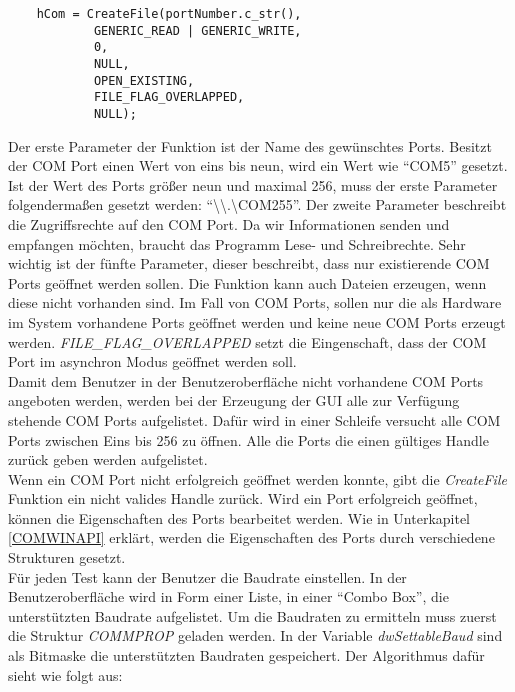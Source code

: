 \begin{lstlisting}	 
	hCom = CreateFile(portNumber.c_str(),  
            GENERIC_READ | GENERIC_WRITE,
            0, 
            NULL,
            OPEN_EXISTING, 
            FILE_FLAG_OVERLAPPED,
            NULL); 

\end{lstlisting}

Der erste Parameter der Funktion ist der Name des gewünschtes Ports. Besitzt der COM Port einen Wert von eins bis neun, wird ein Wert wie "`COM5"' gesetzt. Ist der Wert des Ports größer neun und maximal 256, muss der erste Parameter folgendermaßen gesetzt werden: "`\textbackslash\textbackslash.\textbackslash COM255"'. Der zweite Parameter beschreibt die Zugriffsrechte auf den COM Port. Da wir Informationen senden und empfangen möchten, braucht das Programm Lese- und Schreibrechte. Sehr wichtig ist der fünfte Parameter, dieser beschreibt, dass nur existierende COM Ports geöffnet werden sollen. Die Funktion kann auch Dateien erzeugen, wenn diese nicht vorhanden sind. Im Fall von COM Ports, sollen nur die als Hardware im System vorhandene Ports geöffnet werden und keine neue COM Ports erzeugt werden. \textit{FILE\_FLAG\_OVERLAPPED} setzt die Eingenschaft, dass der COM Port im asynchron Modus geöffnet werden soll.\\

Damit dem Benutzer in der Benutzeroberfläche nicht vorhandene COM Ports angeboten werden, werden bei der Erzeugung der GUI alle zur Verfügung stehende COM Ports aufgelistet. Dafür wird in einer Schleife versucht alle COM Ports zwischen Eins bis 256 zu öffnen. Alle die Ports die einen gültiges Handle zurück geben werden aufgelistet.\\


Wenn ein COM Port nicht erfolgreich geöffnet werden konnte, gibt die \textit{CreateFile} Funktion ein nicht valides Handle zurück. Wird ein Port erfolgreich geöffnet, können die Eigenschaften des Ports bearbeitet werden. Wie in Unterkapitel \ref{COMWINAPI} erklärt, werden die Eigenschaften des Ports durch verschiedene Strukturen gesetzt.\\

Für jeden Test kann der Benutzer die Baudrate einstellen. In der Benutzeroberfläche wird in Form einer Liste, in einer "`Combo Box"', die unterstützten Baudrate aufgelistet. Um die Baudraten zu ermitteln muss zuerst die Struktur \textit{COMMPROP} geladen werden. In der Variable \textit{dwSettableBaud} sind als Bitmaske die unterstützten Baudraten gespeichert. Der Algorithmus dafür sieht wie folgt aus:

